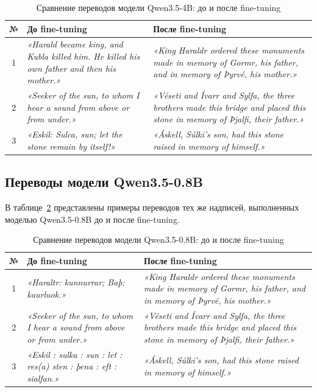 \documentclass[14pt,a4paper]{extreport}
\begin{document}
\begin{table}[H]
\centering
\caption{Сравнение переводов модели Qwen3.5-4B: до и после fine-tuning}
\label{tab:qwen4b_comparison}
\begin{tabular}{|c|p{}|p{}|}
\hline
\textbf{№} & \textbf{До fine-tuning} & \textbf{После fine-tuning} \\
\hline
1 & \textit{«Harald became king, and Kubla killed him. He killed his own father and then his mother.»} & \textit{«King Haraldr ordered these monuments made in memory of Gormr, his father, and in memory of Þyrvé, his mother.»} \\
\hline
2 & \textit{«Seeker of the sun, to whom I hear a sound from above or from under.»} & \textit{«Véseti and Ívarr and Sylfa, the three brothers made this bridge and placed this stone in memory of Þjalfi, their father.»} \\
\hline
3 & \textit{«Eskil: Sulca, sun; let the stone remain by itself!»} & \textit{«Áskell, Súlki's son, had this stone raised in memory of himself.»} \\
\hline
\end{tabular}
\end{table}

\subsection{Переводы модели Qwen3.5-0.8B}

В таблице~\ref{tab:qwen08b_comparison} представлены примеры переводов тех же надписей, выполненных моделью Qwen3.5-0.8B до и после fine-tuning.

\begin{table}[H]
\centering
\caption{Сравнение переводов модели Qwen3.5-0.8B: до и после fine-tuning}
\label{tab:qwen08b_comparison}
\begin{tabular}{|c|p{}|p{}|}
\hline
\textbf{№} & \textbf{До fine-tuning} & \textbf{После fine-tuning} \\
\hline
1 & \textit{«Haraltr: kunnurrar; Baþ: kaurluok.»} & \textit{«King Haraldr ordered these monuments made in memory of Gormr, his father, and in memory of Þyrvé, his mother.»} \\
\hline
2 & \textit{«Seeker of the sun, to whom I hear a sound from above or from under.»} & \textit{«Véseti and Ívarr and Sylfa, the three brothers made this bridge and placed this stone in memory of Þjalfi, their father.»} \\
\hline
3 & \textit{«Eskil : sulka : sun : let : res(a) sten : þena : eft : sialfan.»} & \textit{«Áskell, Súlki's son, had this stone raised in memory of himself.»} \\
\hline
\end{tabular}
\end{table}
\end{document}
